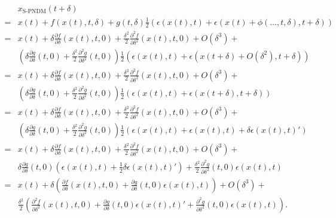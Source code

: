 \documentclass{article}
\begin{document}
\begin{equation}
   \begin{split}
        & x_{\text{S-PNDM}}(t+\delta) \\
       =& x(t) + f(x(t),t,\delta) + g(t,\delta)\frac{1}{2}(\epsilon(x(t),t) + \epsilon(x(t)+\phi(...,t,\delta), t+\delta)) \\
       =& x(t) + \delta\frac{\partial f}{\partial \delta}(x(t),t,0) + \frac{\delta^2}{2}\frac{\partial^2 f}{\partial \delta^2}(x(t),t,0) + O(\delta^3) + \\
        & \left(\delta\frac{\partial g}{\partial \delta}(t,0) + \frac{\delta^2}{2}\frac{\partial^2 g}{\partial \delta^2}(t,0)\right)\frac{1}{2}(\epsilon(x(t),t) + \epsilon(x(t+\delta)+O(\delta^2), t+\delta))  \\
       =& x(t) + \delta\frac{\partial f}{\partial \delta}(x(t),t,0) + \frac{\delta^2}{2}\frac{\partial^2 f}{\partial \delta^2}(x(t),t,0) + O(\delta^3) + \\
        & \left(\delta\frac{\partial g}{\partial \delta}(t,0) + \frac{\delta^2}{2}\frac{\partial^2 g}{\partial \delta^2}(t,0)\right)\frac{1}{2}(\epsilon(x(t),t) + \epsilon(x(t+\delta), t+\delta)) \\
       =& x(t) + \delta\frac{\partial f}{\partial \delta}(x(t),t,0) + \frac{\delta^2}{2}\frac{\partial^2 f}{\partial \delta^2}(x(t),t,0) + O(\delta^3) + \\
        & \left(\delta\frac{\partial g}{\partial \delta}(t,0) + \frac{\delta^2}{2}\frac{\partial^2 g}{\partial \delta^2}(t,0)\right)\frac{1}{2}(\epsilon(x(t),t) + \epsilon(x(t), t) + \delta \epsilon(x(t),t)') \\
       =& x(t) + \delta\frac{\partial f}{\partial \delta}(x(t),t,0) + \frac{\delta^2}{2}\frac{\partial^2 f}{\partial \delta^2}(x(t),t,0) + O(\delta^3) + \\
        & \delta\frac{\partial g}{\partial \delta}(t,0)\left(\epsilon(x(t), t) + \frac{1}{2}\delta \epsilon(x(t),t)'\right) + \frac{\delta^2}{2}\frac{\partial^2 g}{\partial \delta^2}(t,0)\epsilon(x(t),t) \\
       =& x(t) + \delta\left(\frac{\partial f}{\partial \delta}(x(t),t,0) + \frac{\partial g}{\partial \delta}(t,0)\epsilon(x(t), t)\right) + O(\delta^3) + \\
        & \frac{\delta^2}{2}\left(\frac{\partial^2 f}{\partial \delta^2}(x(t),t,0) + \frac{\partial g}{\partial \delta}(t,0) \epsilon(x(t),t)' + \frac{\partial^2 g}{\partial \delta^2}(t,0)\epsilon(x(t),t) \right).
   \end{split}
\end{equation}
\end{document}
